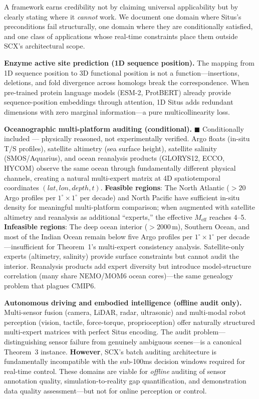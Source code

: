 \documentclass[12pt,a4paper]{article}
\begin{document}
A framework earns credibility not by claiming universal applicability but by clearly stating where it \emph{cannot} work. We document one domain where Situs's preconditions fail structurally, one domain where they are conditionally satisfied, and one class of applications whose real-time constraints place them outside SCX's architectural scope.

\textbf{Enzyme active site prediction (1D sequence position).} The mapping from 1D sequence position to 3D functional position is not a function---insertions, deletions, and fold divergence across homologs break the correspondence. When pre-trained protein language models (ESM-2, ProtBERT) already provide sequence-position embeddings through attention, 1D Situs adds redundant dimensions with zero marginal information---a pure multicollinearity loss.

\textbf{Oceanographic multi-platform auditing (conditional).} \textcolor{projected}{$\blacksquare$ Conditionally included — physically reasoned, not experimentally verified.} Argo floats (in-situ T/S profiles), satellite altimetry (sea surface height), satellite salinity (SMOS/Aquarius), and ocean reanalysis products (GLORYS12, ECCO, HYCOM) observe the same ocean through fundamentally different physical channels, creating a natural multi-expert matrix at 4D spatiotemporal coordinates $(lat,lon,depth,t)$. \textbf{Feasible regions}: The North Atlantic ($>20$ Argo profiles per $1^\circ \times 1^\circ$ per decade) and North Pacific have sufficient in-situ density for meaningful multi-platform comparison; when augmented with satellite altimetry and reanalysis as additional ``experts,'' the effective $M_{\text{eff}}$ reaches 4--5. \textbf{Infeasible regions}: The deep ocean interior ($>2000$\,m), Southern Ocean, and most of the Indian Ocean remain below five Argo profiles per $1^\circ \times 1^\circ$ per decade---insufficient for Theorem~1's multi-expert consistency analysis. Satellite-only experts (altimetry, salinity) provide surface constraints but cannot audit the interior. Reanalysis products add expert diversity but introduce model-structure correlation (many share NEMO/MOM6 ocean cores)---the same genealogy problem that plagues CMIP6.

\textbf{Autonomous driving and embodied intelligence (offline audit only).} Multi-sensor fusion (camera, LiDAR, radar, ultrasonic) and multi-modal robot perception (vision, tactile, force-torque, proprioception) offer naturally structured multi-expert matrices with perfect Situs encoding. The audit problem---distinguishing sensor failure from genuinely ambiguous scenes---is a canonical Theorem~3 instance. \textbf{However}, SCX's batch auditing architecture is fundamentally incompatible with the sub-100ms decision windows required for real-time control. These domains are viable for \emph{offline} auditing of sensor annotation quality, simulation-to-reality gap quantification, and demonstration data quality assessment---but not for online perception or control.
\end{document}
